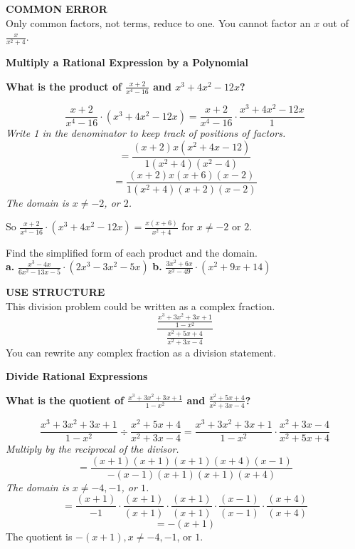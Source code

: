 \documentclass{article}
\newenvironment{concept-box}{}{}
\newenvironment{example}[1]{}{}
\newenvironment{tryit}[1]{}{}
\begin{document}
\begin{concept-box}
\textbf{COMMON ERROR} \\
Only common factors, not terms, reduce to one. You cannot factor an $x$ out of $\frac{x}{x^2 + 4}$.
\end{concept-box}

\begin{example}{4}
\textbf{Multiply a Rational Expression by a Polynomial}

\textbf{What is the product of $\frac{x + 2}{x^4 - 16}$ and $x^3 + 4x^2 - 12x$?}

$$ \frac{x + 2}{x^4 - 16} \cdot (x^3 + 4x^2 - 12x) = \frac{x + 2}{x^4 - 16} \cdot \frac{x^3 + 4x^2 - 12x}{1} $$
\emph{Write 1 in the denominator to keep track of positions of factors.}
$$ = \frac{(x + 2)x(x^2 + 4x - 12)}{1(x^2 + 4)(x^2 - 4)} $$
$$ = \frac{(x + 2)x(x + 6)(x - 2)}{1(x^2 + 4)(x + 2)(x - 2)} $$
\emph{The domain is $x \neq -2$, or $2$.}

So $\frac{x + 2}{x^4 - 16} \cdot (x^3 + 4x^2 - 12x) = \frac{x(x + 6)}{x^2 + 4}$ for $x \neq -2$ or $2$.
\end{example}

\begin{tryit}{4}
Find the simplified form of each product and the domain. \\
\textbf{a.} $\frac{x^3 - 4x}{6x^2 - 13x - 5} \cdot (2x^3 - 3x^2 - 5x)$ \qquad \textbf{b.} $\frac{3x^2 + 6x}{x^2 - 49} \cdot (x^2 + 9x + 14)$
\end{tryit}

\begin{concept-box}
\textbf{USE STRUCTURE} \\
This division problem could be written as a complex fraction.
$$ \frac{\frac{x^3 + 3x^2 + 3x + 1}{1 - x^2}}{\frac{x^2 + 5x + 4}{x^2 + 3x - 4}} $$
You can rewrite any complex fraction as a division statement.
\end{concept-box}

\begin{example}{5}
\textbf{Divide Rational Expressions}

\textbf{What is the quotient of $\frac{x^3 + 3x^2 + 3x + 1}{1 - x^2}$ and $\frac{x^2 + 5x + 4}{x^2 + 3x - 4}$?}

$$ \frac{x^3 + 3x^2 + 3x + 1}{1 - x^2} \div \frac{x^2 + 5x + 4}{x^2 + 3x - 4} = \frac{x^3 + 3x^2 + 3x + 1}{1 - x^2} \cdot \frac{x^2 + 3x - 4}{x^2 + 5x + 4} $$
\emph{Multiply by the reciprocal of the divisor.}
$$ = \frac{(x + 1)(x + 1)(x + 1)(x + 4)(x - 1)}{-(x - 1)(x + 1)(x + 1)(x + 4)} $$
\emph{The domain is $x \neq -4, -1$, or $1$.}
$$ = \frac{(x + 1)}{-1} \cdot \frac{(x + 1)}{(x + 1)} \cdot \frac{(x + 1)}{(x + 1)} \cdot \frac{(x - 1)}{(x - 1)} \cdot \frac{(x + 4)}{(x + 4)} $$
$$ = -(x + 1) $$
The quotient is $-(x + 1), x \neq -4, -1$, or $1$.
\end{example}
\end{document}
